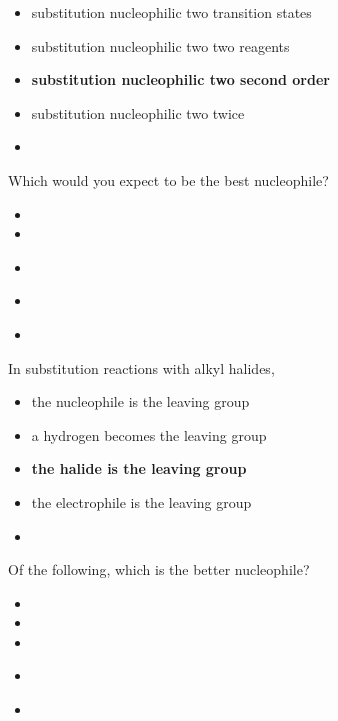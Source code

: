 \documentclass[12pt,a4paper]{article}
\begin{document}
\begin{enumerate}
{    \begin{itemize}
        \item substitution nucleophilic two transition states
        \item substitution nucleophilic two two reagents
        \item {\color{o-Sun}\textbf{substitution nucleophilic two second order}}
        \item substitution nucleophilic two twice
    \end{itemize}
    }
    \begin{itemize}
        \item 
    \end{itemize}
    {\color{G-Moon}\item Which would you expect to be the best nucleophile?
    \begin{itemize}
        \item {}
        \item {}
        \item {\color{o-Sun}\textbf{}}
        \item {}
    \end{itemize}
    }
    \begin{itemize}
        \item 
    \end{itemize}
    {\color{G-Moon}\item In substitution reactions with alkyl halides,
    \begin{itemize}
        \item the nucleophile is the leaving group
        \item a hydrogen becomes the leaving group
        \item {\color{o-Sun}\textbf{the halide is the leaving group}}
        \item the electrophile is the leaving group
    \end{itemize}
    }
    \begin{itemize}
        \item 
    \end{itemize}
    {\color{G-Moon}\item Of the following, which is the better nucleophile?
    \begin{itemize}
        \item {}
        \item {}
        \item {}
        \item {\color{o-Sun}\textbf{}}
    \end{itemize}
    }
    \begin{itemize}
        \item 
    \end{itemize}
\end{enumerate}
\end{document}
